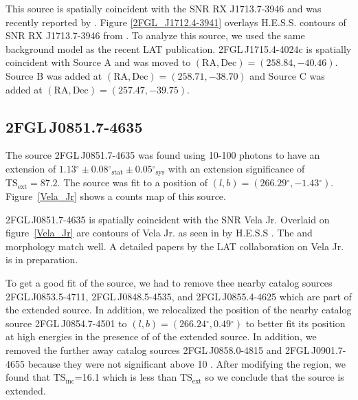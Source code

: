 \documentclass[12pt,preprint]{aastex}
\newcommand{\gev}{\text{GeV}\xspace}
\newcommand{\tev}{\text{TeV}\xspace}
\newcommand{\tsext}{{\ensuremath{\text{TS}_{\text{ext}}}}\xspace}
\newcommand{\tsinc}{\ensuremath{\text{TS}_{\text{inc}}}\xspace}
\newcommand{\sys}{\text{sys}\xspace}
\newcommand{\stat}{\text{stat}\xspace}
\renewcommand{\deg}{\ensuremath{^\circ}\xspace}
\begin{document}
This source is spatially coincident with the SNR RX J1713.7-3946
and was recently reported by \citep{rx_j1713_lat}.  Figure
\ref{2FGL_J1712.4-3941} overlays H.E.S.S. \tev contours of SNR RX
J1713.7-3946 from \citep{rx_j1713_hess}.  To analyze this source,
we used the same background model as the recent LAT publication.
2FGL\,J1715.4-4024c is spatially coincident with Source A and was
moved to $(\text{RA},\text{Dec})=(258.84,-40.46)$. Source B was added
at $(\text{RA},\text{Dec})=(258.71,-38.70)$ and Source C was added at
$(\text{RA},\text{Dec})=(257.47,-39.75)$.

\subsection{2FGL\,J0851.7-4635}
\label{section_2FGL_J0851.7-4635}


The source 2FGL\,J0851.7-4635 was found 
using 10-100 \gev photons to have an
extension of $1.13\deg\pm0.08\deg_\stat\pm0.05\deg_\sys$ 
with an extension
significance of $\tsext=87.2$.  The source was fit to a position of
$(l,b)=(266.29\deg,-1.43\deg)$.  Figure~\ref{Vela_Jr} shows a counts
map of this source.

2FGL\,J0851.7-4635 is spatially coincident with the SNR Vela Jr.
Overlaid on figure~\ref{Vela_Jr} are contours of Vela Jr. as seen in
\tev by H.E.S.S \citep{vela_jr_hess}.  The \gev and \tev morphology
match well.  A detailed papers by the LAT collaboration on Vela Jr. is
in preparation.

To get a good fit of the source, we had to remove thee nearby catalog
sources 2FGL\,J0853.5-4711, 2FGL\,J0848.5-4535, and 2FGL\,J0855.4-4625
which are part of the extended source.  In addition, we relocalized
the position of the nearby catalog source 2FGL\,J0854.7-4501 to
$(l,b)=(266.24\deg,0.49\deg)$ to better fit its position at high energies
in the presence of of the extended source.  In addition, we removed the
further away catalog sources 2FGL\,J0858.0-4815 and 2FGL\,J0901.7-4655
because they were not significant above 10 \gev.  After modifying
the region, we found that \tsinc=16.1 which is less than \tsext so we
conclude that the source is extended. 
\end{document}
